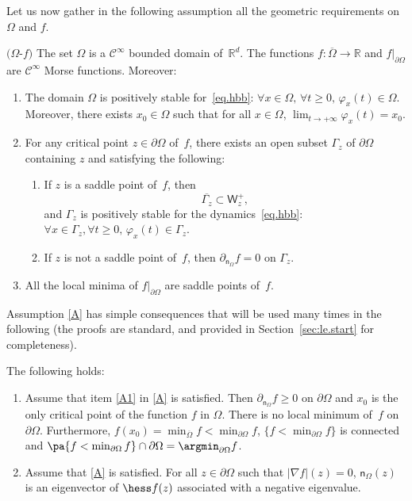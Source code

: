 Let us now gather
in the following assumption all the geometric requirements on $\Omega$
and $f$.
\begin{manualassumption}{$(\Omega$-$f)$}\label{A}
The set $\Omega$ is a $\mathcal C^\infty$ bounded domain of~$\mathbb R^d$. The functions \hbox{$f:\overline \Omega\to \mathbb R$} and $f|_{\partial \Omega}$
are $\mathcal C^\infty$ Morse functions. Moreover:
\begin{enumerate}
\item\label{A1}
The domain $\Omega$ is positively stable for~\eqref{eq.hbb}:
$\forall x\in \Omega, \, \forall t\ge 0, \, \varphi_x(t)\in
\Omega$. Moreover, there exists $x_0\in \Omega$ such that for all $x\in \Omega$, $\lim_{t\to +\infty}\varphi_x(t)=x_0$.

\item\label{A2}
For any critical point $z\in \partial \Omega$ of~$f$, there exists an open
subset $\Gamma_z$ of $\partial
\Omega$ containing $z$ and satisfying the following:
\begin{enumerate}
\item\label{A2a}
If $z$ is a saddle point of~$f$, then
\begin{equation}\label{eq.incluWW}
\overline{\Gamma_{z} }\subset \mathsf W_z^+,
\end{equation}
and $\Gamma_z$ is positively stable for the
dynamics~\eqref{eq.hbb}: $\forall x\in \Gamma_{z}, \forall t\ge 0,
\, \varphi_x(t)\in \Gamma_{z}$.

\item\label{A2b}
If $z$ is not a saddle point of~$f$, then $\partial_{\mathsf n_\Omega} f=0$ on $\Gamma_z$.
\end{enumerate}

\item\label{A3}
All the local minima of $f|_{\partial \Omega}$ are saddle points of~$f$.
\end{enumerate}
\end{manualassumption}

Assumption \ref{A} has simple consequences that will be used
many times in the following (the proofs are standard, and provided in
Section~\ref{sec:le.start} for completeness).

\begin{lemma}\label{le.start}
The following holds:
\begin{enumerate}
\item\label{le.start1}
Assume that item \eqref{A1} in \ref{A} is satisfied. Then $\partial_{\mathsf n_\Omega}f\ge 0$ on $\partial \Omega$ and $x_0$ is the only critical point of the function $f$ in $\Omega$. There is no local minimum of~$f$ on $\partial \Omega$. Furthermore,
$f(x_0)=\min_{\overline \Omega}f<\min_{\partial \Omega}f$, $\{f< \min_{\partial \Omega}f\}$ is connected and $\pa \{f< \min_{\partial \Omega}f\}\cap \partial \Omega =\argmin_{\partial \Omega}f$.

\item\label{le.start2}
Assume that \ref{A} is satisfied. For all $z\in \partial \Omega$ such that $\vert \nabla f\vert (z)=0$, $\mathsf n_\Omega(z)$ is an eigenvector of $\hess f(z)$ associated with a negative eigenvalue.
\end{enumerate}
\end{lemma}

